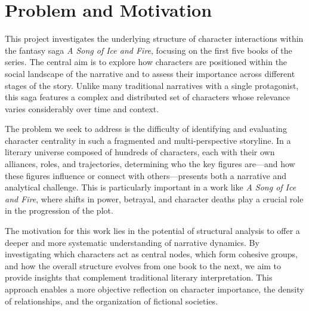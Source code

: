 \documentclass[12pt, a4paper]{article}
\begin{document}
\section{Problem and Motivation}
\label{problem-and-motivation}
\begin{comment}
	(Identifying the importance of the characters in the 5 books)
	What are the problems you want to address? Why are those problems
	important (impact, theoretical and/or practical needs, etc.)? What are
	the main contributions of the project?
	\section{Problem and Motivation}
\end{comment}


This project investigates the underlying structure of character interactions within the fantasy saga \textit{A Song of Ice and Fire}, focusing on the first five books of the series. The central aim is to explore how characters are positioned within the social landscape of the narrative and to assess their importance across different stages of the story. Unlike many traditional narratives with a single protagonist, this saga features a complex and distributed set of characters whose relevance varies considerably over time and context.

The problem we seek to address is the difficulty of identifying and evaluating character centrality in such a fragmented and multi-perspective storyline. In a literary universe composed of hundreds of characters, each with their own alliances, roles, and trajectories, determining who the key figures are—and how these figures influence or connect with others—presents both a narrative and analytical challenge. This is particularly important in a work like \textit{A Song of Ice and Fire}, where shifts in power, betrayal, and character deaths play a crucial role in the progression of the plot.

The motivation for this work lies in the potential of structural analysis to offer a deeper and more systematic understanding of narrative dynamics. By investigating which characters act as central nodes, which form cohesive groups, and how the overall structure evolves from one book to the next, we aim to provide insights that complement traditional literary interpretation. This approach enables a more objective reflection on character importance, the density of relationships, and the organization of fictional societies.
\end{document}
